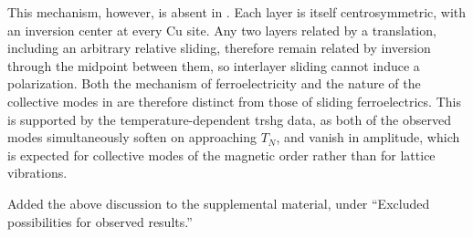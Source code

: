 This mechanism, however, is absent in .
Each  layer is itself centrosymmetric, with an inversion center at every Cu site.
Any two layers related by a translation, including an arbitrary relative sliding, therefore remain related by inversion through the midpoint between them, so interlayer sliding cannot induce a polarization. 
Both the mechanism of ferroelectricity and the nature of the collective modes in  are therefore distinct from those of sliding ferroelectrics.
This is supported by the temperature-dependent \gls{trshg} data, as both of the observed modes simultaneously soften on approaching $T_N$, and vanish in amplitude, which is expected for collective modes of the magnetic order rather than for lattice vibrations.

\begin{changesmade}
Added the above discussion to the supplemental material, under ``Excluded possibilities for observed results.''
\end{changesmade}

